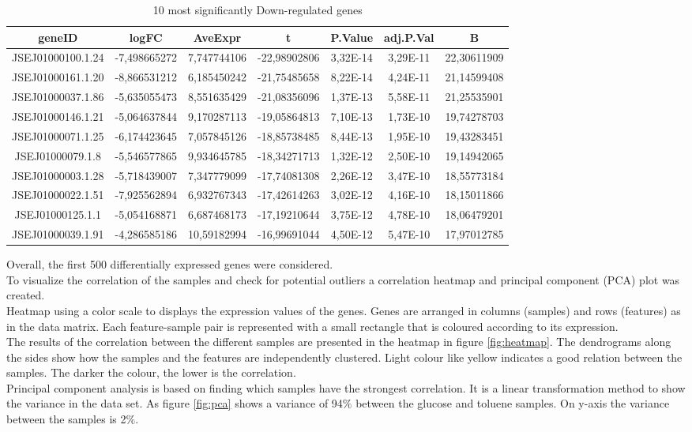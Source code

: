 \documentclass[12pt, a4paper]{report}
\newcommand{\HT}[1]{\textcolor{red}{#1}}
\begin{document}
\begin{table}[H]
	\centering
	\scriptsize
	\begin{tabular}{c|c|c|c|c|c|c}
		\textbf{geneID}& \textbf{logFC}&\textbf{AveExpr}&\textbf{t}&\textbf{P.Value}&\textbf{adj.P.Val}& \textbf{B}\\
		\hline
		JSEJ01000100.1.24&	-7,498665272&	7,747744106&	-22,98902806&	3,32E-14&	3,29E-11&	22,30611909\\
		JSEJ01000161.1.20&	-8,866531212&	6,185450242	&-21,75485658	&8,22E-14&	4,24E-11&	21,14599408\\
		JSEJ01000037.1.86&	-5,635055473&	8,551635429	&-21,08356096&	1,37E-13&	5,58E-11&	21,25535901\\
		JSEJ01000146.1.21	&-5,064637844&	9,170287113	&-19,05864813&	7,10E-13&	1,73E-10&	19,74278703\\
		JSEJ01000071.1.25	&-6,174423645&	7,057845126	&-18,85738485&	8,44E-13&	1,95E-10&	19,43283451\\
		JSEJ01000079.1.8	&-5,546577865&	9,934645785	&-18,34271713&	1,32E-12&	2,50E-10&	19,14942065\\
		JSEJ01000003.1.28&	-5,718439007&	7,347779099	&-17,74081308&	2,26E-12&	3,47E-10&	18,55773184\\
		JSEJ01000022.1.51&	-7,925562894&	6,932767343	&-17,42614263&	3,02E-12&	4,16E-10&	18,15011866\\
		JSEJ01000125.1.1&	-5,054168871&	6,687468173	&-17,19210644&	3,75E-12&	4,78E-10&	18,06479201\\
		JSEJ01000039.1.91&	-4,286585186&	10,59182994	&-16,99691044&	4,50E-12&	5,47E-10&	17,97012785\\
		\hline
	\end{tabular}
	\caption{10 most significantly Down-regulated genes}
\end{table}

Overall, the first 500 differentially expressed genes were considered. \\
To visualize the correlation of the samples and check for potential outliers a correlation heatmap and principal component (PCA) plot was created. \\
Heatmap using a color scale to displays the expression values of the genes. Genes are arranged in columns (samples) and rows (features) as in the data matrix. Each feature-sample pair is represented with a small rectangle that is coloured according to its expression. \\
The results of the correlation between the different samples are presented in the heatmap in figure \ref{fig:heatmap}. The dendrograms along the sides show how the samples and the features are independently clustered. Light colour like yellow indicates a good relation between the samples. The darker the colour, the lower is the correlation. \\
Principal component analysis is based on finding which samples have the strongest correlation. It is a linear transformation method to show the variance in the data set. As figure \ref{fig:pca} shows a variance of 94$\%$ between the glucose and toluene samples. On y-axis the variance between the samples is 2$\%$. 
\ \\
\end{document}

